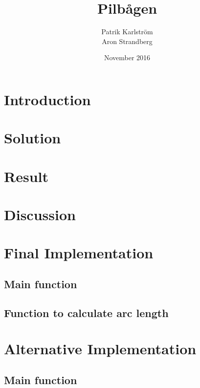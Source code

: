 \documentclass{article}
\title{Pilbågen}
\author{Patrik Karlström \\ Aron Strandberg }
\date{November 2016}
\begin{document}
\maketitle

\section{Introduction}



\section{Solution}



\section{Result}



\section{Discussion}



\newpage
\appendix
\section{Final Implementation} \label{app:Appendix A}

\subsection{Main function}


\subsection{Function to calculate arc length}


\appendix
\section{Alternative Implementation} \label{app:Appendix B}

\subsection{Main function}

\end{document}
